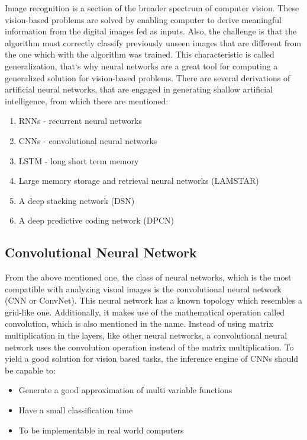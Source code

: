 \documentclass[12pt,a4paper,twoside]{report}
\begin{document}
Image recognition is a section of the broader spectrum of computer vision. These vision-based problems are solved by enabling computer to derive meaningful information from the digital images fed as inputs. Also, the challenge is that the algorithm must correctly classify previously unseen images that are different from the one which with the algorithm was trained. This characteristic is called generalization, that`s why neural networks are a great tool for computing a generalized solution for vision-based problems. There are several derivations of artificial neural networks, that are engaged in generating shallow artificial intelligence, from which there are mentioned:


\begin{enumerate}
    \item RNNs - recurrent neural networks
    \item CNNs - convolutional neural networks
    \item LSTM - long short term memory
    \item Large memory storage and retrieval neural networks (LAMSTAR)
    \item A deep stacking network (DSN)
    \item A deep predictive coding network (DPCN)
\end{enumerate}

\subsection{Convolutional Neural Network}

From the above mentioned one, the class of neural networks, which is the most compatible with analyzing visual images is the convolutional neural network (CNN or ConvNet). This neural network has a known topology which resembles a grid-like one. Additionally, it makes use of the mathematical operation called convolution, which is also mentioned in the name. Instead of using matrix multiplication in the layers, like other neural networks, a convolutional neural network uses the convolution operation instead of the matrix multiplication. To yield a good solution for vision based tasks, the inference engine of CNNs should be capable to:
\begin{itemize}
    \item Generate a good approximation of multi variable functions
    \item Have a small classification time
    \item To be implementable in real world computers
\end{itemize}
\end{document}
